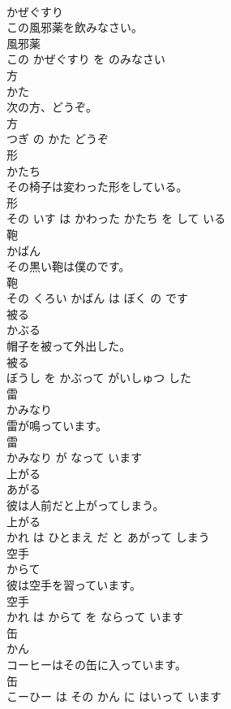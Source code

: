 \documentclass[8pt]{extreport}
\begin{document}
\begin{CJK}{UTF8}{min}
\\	かぜぐすり			
\\	この風邪薬を飲みなさい。	
\\	風邪薬 
\\	この かぜぐすり を のみなさい			
\\	方	
\\	かた			
\\	次の方、どうぞ。	
\\	方 
\\	つぎ の かた どうぞ			
\\	形	
\\	かたち			
\\	その椅子は変わった形をしている。	
\\	形 
\\	その いす は かわった かたち を して いる			
\\	鞄	
\\	かばん			
\\	その黒い鞄は僕のです。	
\\	鞄 
\\	その くろい かばん は ぼく の です			
\\	被る	
\\	かぶる			
\\	帽子を被って外出した。	
\\	被る 
\\	ぼうし を かぶって がいしゅつ した			
\\	雷	
\\	かみなり			
\\	雷が鳴っています。	
\\	雷 
\\	かみなり が なって います			
\\	上がる	
\\	あがる			
\\	彼は人前だと上がってしまう。	
\\	上がる 
\\	かれ は ひとまえ だ と あがって しまう			
\\	空手	
\\	からて			
\\	彼は空手を習っています。	
\\	空手 
\\	かれ は からて を ならって います			
\\	缶	
\\	かん			
\\	コーヒーはその缶に入っています。	
\\	缶 
\\	こーひー は その かん に はいって います			

\end{CJK}
\end{document}
